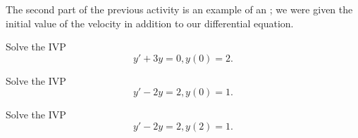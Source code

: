 \begin{applicationActivities}
\begin{definition}
The second part of the previous activity is an example of an ; we were given the initial value of the velocity in addition to our differential equation.
\end{definition}

\begin{activity}{10}
Solve the IVP
\[y'+3y=0, y(0)=2.\]
\end{activity}

\begin{activity}{10}
Solve the IVP
\[y'-2y=2, y(0)=1.\]
\end{activity}

\begin{activity}{5}
Solve the IVP
\[y'-2y=2, y(2)=1.\]
\end{activity}




\end{applicationActivities}
